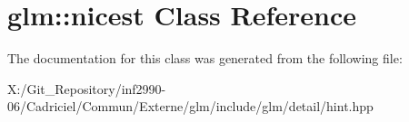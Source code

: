 \hypertarget{classglm_1_1nicest}{\section{glm\-:\-:nicest Class Reference}
\label{classglm_1_1nicest}
}


The documentation for this class was generated from the following file\-:\begin{DoxyCompactItemize}
\item 
X\-:/\-Git\-\_\-\-Repository/inf2990-\/06/\-Cadriciel/\-Commun/\-Externe/glm/include/glm/detail/hint.\-hpp\end{DoxyCompactItemize}
